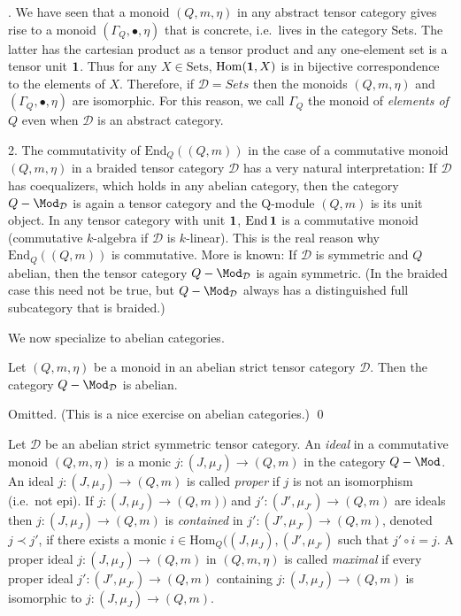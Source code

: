 \documentclass[11pt]{article}
\theoremstyle{definition}
\theoremstyle{definition}
\theoremstyle{remark}
\def\2#1{{\mathcal #1}}
\def\1#1{{\bf #1}}
\newcommand{\Hom}{\mathrm{Hom}}
\newcommand{\End}{\mathrm{End}}
\newcommand{\mcirc}{\circ}
\newcommand{\rarr}{\rightarrow}
\begin{document}
. We have seen that a monoid $(Q,m,\eta)$ in any abstract tensor category gives rise to a
monoid $(\Gamma_Q,\bullet,\eta)$ that is concrete, i.e.\ lives in the category Sets. The latter has
the cartesian product as a tensor product and any one-element set is a tensor unit $\11$. Thus for
any $X\in\mathrm{Sets}$, $\Hom(\11,X)$ is in bijective correspondence to the elements of
$X$. Therefore, if $\2D=Sets$ then the monoids $(Q,m,\eta)$ and $(\Gamma_Q,\bullet,\eta)$ are
isomorphic. For this reason, we call $\Gamma_Q$ the monoid of \emph{elements of $Q$} even when $\2D$
is an abstract category. 

2. The commutativity of $\End_Q((Q,m))$ in the case of a commutative monoid $(Q,m,\eta)$ in a
braided tensor category $\2D$ has a very natural interpretation: If $\2D$ has coequalizers, which
holds in any abelian category, then the category $Q-\Mod_\2D$ is again a tensor category and the
Q-module $(Q,m)$ is its unit object. In any tensor category with unit $\11$, $\End\,\11$ is a
commutative monoid  (commutative $k$-algebra if $\2D$ is $k$-linear). This is the real reason why
$\End_Q((Q,m))$ is commutative. 
More is known: If $\2D$ is symmetric and $Q$ abelian, then the tensor category $Q-\Mod_\2D$ is again
symmetric. (In the braided case this need not be true, but $Q-\Mod_\2D$ always has a distinguished
full subcategory that is braided.)
\erem

We now specialize to abelian categories.

\bprop
Let $(Q,m,\eta)$ be a monoid in an abelian strict tensor category $\2D$. Then the category
$Q-\Mod_\2D$ is abelian.
\eprop

\prf Omitted. (This is a nice exercise on abelian categories.)
\qed

\bdefin {}
Let $\2D$ be an abelian strict symmetric tensor category.
An \emph{ideal} in a commutative monoid $(Q,m,\eta)$ is a monic $j:(J,\mu_J)\rarr(Q,m)$ in the
category $Q-\Mod$. An ideal $j:(J,\mu_J)\rarr(Q,m)$ is called \emph{proper} if $j$ is not an
isomorphism (i.e.\ not epi). If $j:(J,\mu_J)\rarr(Q,m))$ and $j':(J',\mu_{J'})\rarr(Q,m)$ are ideals
then $j:(J,\mu_J)\rarr(Q,m)$ is \emph{contained} in $j':(J',\mu_{J'})\rarr(Q,m)$, denoted
$j\prec j'$, if there exists a monic $i\in\Hom_Q((J,\mu_J),(J',\mu_{J'})$ such that $j'\mcirc i=j$. 
A proper ideal $j:(J,\mu_J)\rarr(Q,m)$ in $(Q,m,\eta)$ is called \emph{maximal} if every proper
ideal $j':(J',\mu_{J'})\rarr(Q,m)$ containing $j:(J,\mu_J)\rarr(Q,m)$ is isomorphic to
$j:(J,\mu_J)\rarr(Q,m)$.  
\edefin
\end{document}
